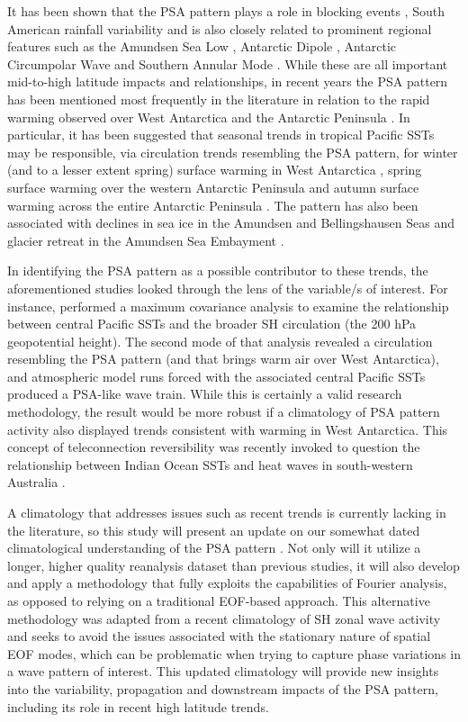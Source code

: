 It has been shown that the PSA pattern plays a role in blocking events \citep{Sinclair1997,Renwick1999}, South American rainfall variability \citep{Mo2001} and is also closely related to prominent regional features such as the Amundsen Sea Low \citep{Turner2013}, Antarctic Dipole \citep{Yuan2001}, Antarctic Circumpolar Wave \citep{Christoph1998} and Southern Annular Mode \citep[SAM; e.g.][]{Ding2012,Fogt2012}. While these are all important mid-to-high latitude impacts and relationships, in recent years the PSA pattern has been mentioned most frequently in the literature in relation to the rapid warming observed over West Antarctica and the Antarctic Peninsula \citep{Nicolas2014}. In particular, it has been suggested that seasonal trends in tropical Pacific SSTs may be responsible, via circulation trends resembling the PSA pattern, for winter (and to a lesser extent spring) surface warming in West Antarctica \citep{Ding2011}, spring surface warming over the western Antarctic Peninsula \citep{Clem2015} and autumn surface warming across the entire Antarctic Peninsula \citep{Ding2013}. The pattern has also been associated with declines in sea ice in the Amundsen and Bellingshausen Seas \citep{Schneider2012} and glacier retreat in the Amundsen Sea Embayment \citep{Steig2012}.

In identifying the PSA pattern as a possible contributor to these trends, the aforementioned studies looked through the lens of the variable/s of interest. For instance, \citet{Ding2011} performed a maximum covariance analysis to examine the relationship between central Pacific SSTs and the broader SH circulation (the 200 hPa geopotential height). The second mode of that analysis revealed a circulation resembling the PSA pattern (and that brings warm air over West Antarctica), and atmospheric model runs forced with the associated central Pacific SSTs produced a PSA-like wave train. While this is certainly a valid research methodology, the result would be more robust if a climatology of PSA pattern activity also displayed trends consistent with warming in West Antarctica. This concept of teleconnection reversibility was recently invoked to question the relationship between Indian Ocean SSTs and heat waves in south-western Australia \citep{Boschat2016}.   

A climatology that addresses issues such as recent trends is currently lacking in the literature, so this study will present an update on our somewhat dated climatological understanding of the PSA pattern \citep{Mo1998,Mo2001}. Not only will it utilize a longer, higher quality reanalysis dataset than previous studies, it will also develop and apply a methodology that fully exploits the capabilities of Fourier analysis, as opposed to relying on a traditional EOF-based approach. This alternative methodology was adapted from a recent climatology of SH zonal wave activity \citep{IrvingSimmonds2015} and seeks to avoid the issues associated with the stationary nature of spatial EOF modes, which can be problematic when trying to capture phase variations in a wave pattern of interest. This updated climatology will provide new insights into the variability, propagation and downstream impacts of the PSA pattern, including its role in recent high latitude trends. 


